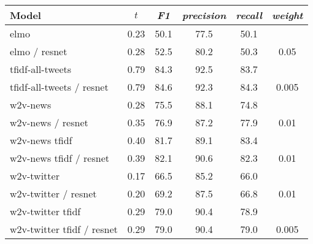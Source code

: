 \begin{tabular}{|l|ccccc|}
\hline
             \textbf{Model} &   $t$ &  \textit{F1} &  \textit{precision} &  \textit{recall} & \textit{weight} \\
\hline
                       elmo &  0.23 &         50.1 &                77.5 &             50.1 &                 \\
              elmo / resnet &  0.28 &         52.5 &                80.2 &             50.3 &            0.05 \\
           tfidf-all-tweets &  0.79 &         84.3 &                92.5 &             83.7 &                 \\
  tfidf-all-tweets / resnet &  0.79 &         84.6 &                92.3 &             84.3 &           0.005 \\
                   w2v-news &  0.28 &         75.5 &                88.1 &             74.8 &                 \\
          w2v-news / resnet &  0.35 &         76.9 &                87.2 &             77.9 &            0.01 \\
             w2v-news tfidf &  0.40 &         81.7 &                89.1 &             83.4 &                 \\
    w2v-news tfidf / resnet &  0.39 &         82.1 &                90.6 &             82.3 &            0.01 \\
                w2v-twitter &  0.17 &         66.5 &                85.2 &             66.0 &                 \\
       w2v-twitter / resnet &  0.20 &         69.2 &                87.5 &             66.8 &            0.01 \\
          w2v-twitter tfidf &  0.29 &         79.0 &                90.4 &             78.9 &                 \\
 w2v-twitter tfidf / resnet &  0.29 &         79.0 &                90.4 &             79.0 &           0.005 \\
\hline
\end{tabular}
